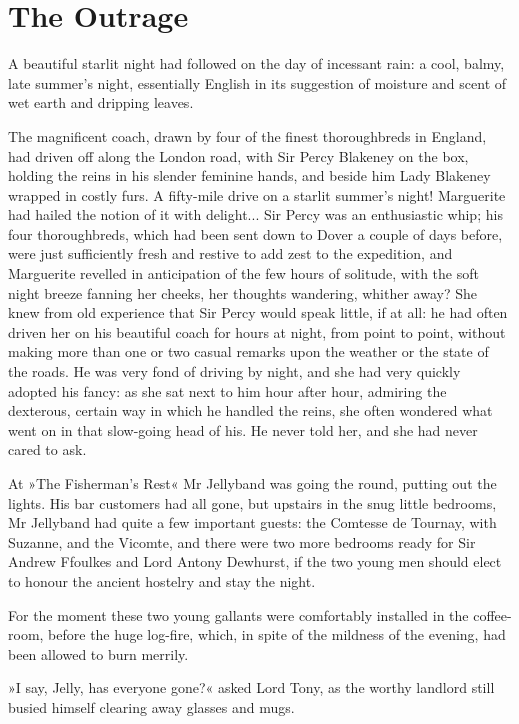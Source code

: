 
\chapter{The Outrage}
\lettrine[lines=4]{A}{} beautiful starlit night had followed on the day of incessant rain: a cool, balmy, late summer's night, essentially English in its suggestion of moisture and scent of wet earth and dripping leaves.

The magnificent coach, drawn by four of the finest thoroughbreds in England, had driven off along the London road, with Sir Percy Blakeney on the box, holding the reins in his slender feminine hands, and beside him Lady Blakeney wrapped in costly furs. A fifty-mile drive on a starlit summer's night! Marguerite had hailed the notion of it with delight... Sir Percy was an enthusiastic whip; his four thoroughbreds, which had been sent down to Dover a couple of days before, were just sufficiently fresh and restive to add zest to the expedition, and Marguerite revelled in anticipation of the few hours of solitude, with the soft night breeze fanning her cheeks, her thoughts wandering, whither away? She knew from old experience that Sir Percy would speak little, if at all: he had often driven her on his beautiful coach for hours at night, from point to point, without making more than one or two casual remarks upon the weather or the state of the roads. He was very fond of driving by night, and she had very quickly adopted his fancy: as she sat next to him hour after hour, admiring the dexterous, certain way in which he handled the reins, she often wondered what went on in that slow-going head of his. He never told her, and she had never cared to ask.

At »The Fisherman's Rest« Mr Jellyband was going the round, putting out the lights. His bar customers had all gone, but upstairs in the snug little bedrooms, Mr Jellyband had quite a few important guests: the Comtesse de Tournay, with Suzanne, and the Vicomte, and there were two more bedrooms ready for Sir Andrew Ffoulkes and Lord Antony Dewhurst, if the two young men should elect to honour the ancient hostelry and stay the night.

For the moment these two young gallants were comfortably installed in the coffee-room, before the huge log-fire, which, in spite of the mildness of the evening, had been allowed to burn merrily.

»I say, Jelly, has everyone gone?« asked Lord Tony, as the worthy landlord still busied himself clearing away glasses and mugs.

